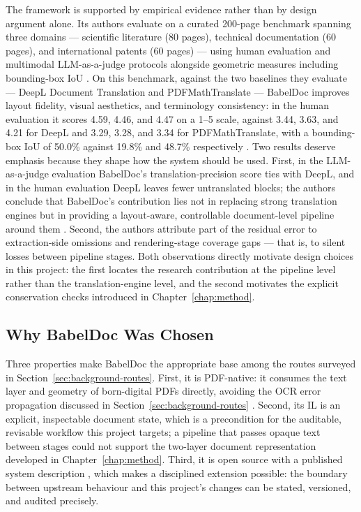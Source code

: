 The framework is supported by empirical evidence rather than by design
argument alone. Its authors evaluate on a curated 200-page benchmark
spanning three domains --- scientific literature (80 pages), technical
documentation (60 pages), and international patents (60 pages) ---
using human evaluation and multimodal LLM-as-a-judge protocols
alongside geometric measures including bounding-box IoU
\cite{qi2026babeldoc}. On this benchmark, against the two baselines
they evaluate --- DeepL Document Translation and PDFMathTranslate ---
BabelDoc improves layout fidelity, visual aesthetics, and terminology
consistency: in the human evaluation it scores 4.59, 4.46, and 4.47 on
a 1--5 scale, against 3.44, 3.63, and 4.21 for DeepL and 3.29, 3.28,
and 3.34 for PDFMathTranslate, with a bounding-box IoU of 50.0\%
against 19.8\% and 48.7\% respectively
\cite{qi2026babeldoc}. Two results deserve emphasis because they shape
how the system should be used. First, in the LLM-as-a-judge evaluation
BabelDoc's translation-precision score ties with DeepL, and in the
human evaluation DeepL leaves fewer untranslated blocks; the authors
conclude that BabelDoc's contribution lies not in replacing strong
translation engines but in providing a layout-aware, controllable
document-level pipeline around them \cite{qi2026babeldoc}. Second, the
authors attribute part of the residual error to extraction-side
omissions and rendering-stage coverage gaps \cite{qi2026babeldoc} ---
that is, to silent losses between pipeline stages. Both observations
directly motivate design choices in this project: the first locates the
research contribution at the pipeline level rather than the
translation-engine level, and the second motivates the explicit
conservation checks introduced in
Chapter~\ref{chap:method}.

\subsection{Why BabelDoc Was Chosen}

Three properties make BabelDoc the appropriate base among the routes
surveyed in Section~\ref{sec:background-routes}. First, it is PDF-native: it
consumes the text layer and geometry of born-digital PDFs directly,
avoiding the OCR error propagation discussed in
Section~\ref{sec:background-routes} \cite{kim2021donut}. Second, its IL is an
explicit, inspectable document state, which is a precondition for the
auditable, revisable workflow this project targets; a pipeline that
passes opaque text between stages could not support the two-layer
document representation developed in Chapter~\ref{chap:method}. Third,
it is open source with a published system description
\cite{qi2026babeldoc}, which makes a disciplined extension possible:
the boundary between upstream behaviour and this project's changes can
be stated, versioned, and audited precisely.

